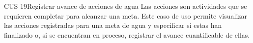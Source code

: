 
\begin{UseCase}{CUS 19}{Registrar avance de acciones de agua}
    {
	Las acciones son actividades que se requieren completar para alcanzar una meta. Este caso de uso permite visualizar las acciones registradas para una meta de agua y especificar si estas han finalizado o, si se encuentran en proceso, registrar el avance cuantificable de ellas.
    }
    
    


\end{UseCase}
